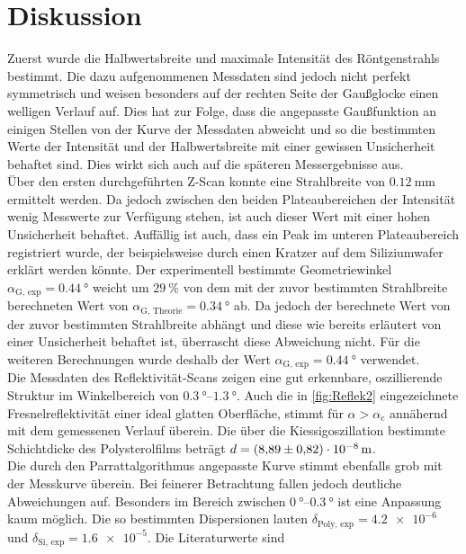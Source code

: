 \section{Diskussion}
\label{sec:Diskussion}
Zuerst wurde die Halbwertsbreite und maximale Intensität des Röntgenstrahls bestimmt. Die dazu aufgenommenen Messdaten sind jedoch nicht perfekt symmetrisch und weisen 
besonders auf der rechten Seite der Gaußglocke einen welligen Verlauf auf. Dies hat zur Folge, dass die angepasste Gaußfunktion an einigen Stellen von der Kurve der 
Messdaten abweicht und so die bestimmten Werte der Intensität und der Halbwertsbreite mit einer gewissen Unsicherheit behaftet sind. Dies wirkt sich auch auf die späteren
Messergebnisse aus.\\
Über den ersten durchgeführten Z-Scan konnte eine  Strahlbreite von $\qty{0.12}{\milli\metre}$ ermittelt werden. Da jedoch zwischen den beiden Plateaubereichen der Intensität 
wenig Messwerte zur Verfügung stehen, ist auch dieser Wert mit einer hohen Unsicherheit behaftet. Auffällig ist auch, dass ein Peak im unteren Plateaubereich registriert wurde,
der beispielsweise durch einen Kratzer auf dem Siliziumwafer erklärt werden könnte. 
Der experimentell bestimmte Geometriewinkel $\alpha_\text{G, exp} = \qty{0.44}{\degree}$ weicht um $\qty{29}{\percent}$ von dem mit der zuvor bestimmten Strahlbreite 
berechneten Wert von $\alpha_\text{G, Theorie} = \qty{0.34}{\degree}$ ab. Da jedoch der berechnete Wert von der zuvor bestimmten Strahlbreite abhängt und diese wie bereits 
erläutert von einer Unsicherheit behaftet ist, überrascht diese Abweichung nicht. Für die weiteren Berechnungen wurde deshalb der Wert 
$\alpha_\text{G, exp} = \qty{0.44}{\degree}$ verwendet. \\
Die Messdaten des Reflektivität-Scans zeigen eine gut erkennbare, oszillierende Struktur im Winkelbereich von $\qtyrange{0.3}{1.3}{\degree}$. Auch die in \autoref{fig:Reflek2}
eingezeichnete Fresnelreflektivität einer ideal glatten Oberfläche, stimmt für $\alpha > \alpha_\text{c}$ annähernd mit dem gemessenen Verlauf überein. Die über die 
Kiessigoszillation bestimmte Schichtdicke des Polysterolfilms beträgt $d = \qty{8.89 +- 0.82e-8}{\metre}$.\\
Die durch den Parrattalgorithmus angepasste Kurve stimmt ebenfalls grob mit der Messkurve überein. Bei feinerer Betrachtung fallen jedoch deutliche Abweichungen auf.
Besonders im Bereich zwischen $\qtyrange{0}{0.3}{\degree}$ ist eine Anpassung kaum möglich.
Die so bestimmten Dispersionen lauten  $\delta_\text{Poly, exp} = \num{4.2e-6}$ und $\delta_\text{Si, exp} = \num{1.6e-5}$. Die Literaturwerte sind
